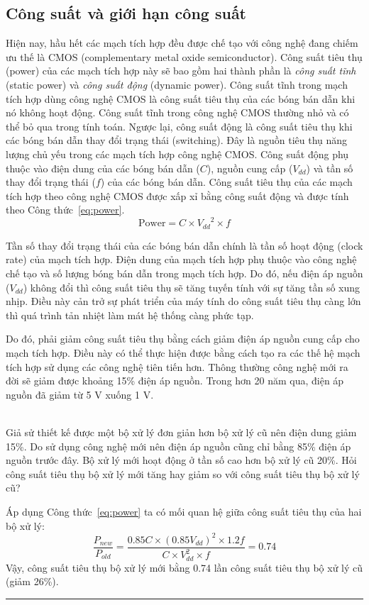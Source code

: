 \subsection{Công suất và giới hạn công suất}
Hiện nay, hầu hết các mạch tích hợp đều được chế tạo với công nghệ đang chiếm ưu thế là CMOS (complementary metal oxide semiconductor). Công suất tiêu thụ (power) của các mạch tích hợp này sẽ bao gồm hai thành phần là \emph{công suất tĩnh} (static power) và \emph{công suất động} (dynamic power). Công suất tĩnh trong mạch tích hợp dùng công nghệ CMOS là công suất tiêu thụ của các bóng bán dẫn khi nó không hoạt động. Công suất tĩnh trong công nghệ CMOS thường nhỏ và có thể bỏ qua trong tính toán. Ngược lại, công suất động là công suất tiêu thụ khi các bóng bán dẫn thay đổi trạng thái (switching). Đây là nguồn tiêu thụ năng lượng chủ yếu trong các mạch tích hợp công nghệ CMOS. Công suất động phụ thuộc vào điện dung của các bóng bán dẫn ($C$), nguồn cung cấp ($V_{dd}$) và tần số thay đổi trạng thái ($f$) của các bóng bán dẫn. Công suất tiêu thụ của các mạch tích hợp theo công nghệ CMOS được xấp xỉ bằng công suất động và được tính theo Công thức~\ref{eq:power}.
\begin{equation}
\label{eq:power}
\text{Power} = C\times {V_{dd}}^2 \times f
\end{equation}

Tần số thay đổi trạng thái của các bóng bán dẫn chính là tần số hoạt động (clock rate) của mạch tích hợp. Điện dung của mạch tích hợp phụ thuộc vào công nghệ chế tạo và số lượng bóng bán dẫn trong mạch tích hợp. Do đó, nếu điện áp nguồn ($V_{dd}$) không đổi thì công suất tiêu thụ sẽ tăng tuyến tính với sự tăng tần số xung nhịp. Điều này cản trở sự phát triển của máy tính do công suất tiêu thụ càng lớn thì quá trình tản nhiệt làm mát hệ thống càng phức tạp.

Do đó, phải giảm công suất tiêu thụ bằng cách giảm điện áp nguồn cung cấp cho mạch tích hợp. Điều này có thể thực hiện được bằng cách tạo ra các thế hệ mạch tích hợp sử dụng các công nghệ tiên tiến hơn. Thông thường công nghệ mới ra đời sẽ giảm được khoảng 15\% điện áp nguồn. Trong hơn 20 năm qua, điện áp nguồn đã giảm từ 5 V xuống 1 V.

\begin{exmp}
\hrulefill\\
Giả sử thiết kế được một bộ xử lý đơn giản hơn bộ xử lý cũ nên điện dung giảm 15\%. Do sử dụng công nghệ mới nên điện áp nguồn cũng chỉ bằng 85\% điện áp nguồn trước đây. Bộ xử lý mới hoạt động ở tần số cao hơn bộ xử lý cũ 20\%. Hỏi công suất tiêu thụ bộ xử lý mới tăng hay giảm so với công suất tiêu thụ bộ xử lý cũ?
\end{exmp}
\begin{answ}
Áp dụng Công thức~\ref{eq:power} ta có mối quan hệ giữa công suất tiêu thụ của hai bộ xử lý:
\begin{equation*}
\frac{P_{new}}{P_{old}} = \frac{0.85C \times (0.85V_{dd})^2 \times 1.2f}{C \times V_{dd}^2 \times f} = 0.74
\end{equation*}
Vậy, công suất tiêu thụ bộ xử lý mới bằng 0.74 lần công suất tiêu thụ bộ xử lý cũ (giảm 26\%).\\
\hrule
\end{answ}

